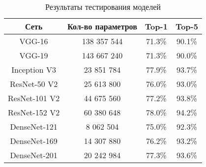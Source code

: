 \begin{table}[H]
    \centering
    \caption{Результаты тестирования моделей} \label{conv-test}
    \begin{tabular}{|c|c|c|c|}
      \hline    
      Сеть         & Кол-во параметров   & Top-1     & Top-5     \\
      \hline
      VGG-16       & 138 357 544         & 71.3\%	& 90.1\%    \\
      \hline
      VGG-19       & 143 667 240         & 71.3\%	& 90.0\%    \\
      \hline
      Inception V3 & 23 851 784          & 77.9\%	& 93.7\%    \\
      \hline
      ResNet-50 V2 & 25 613 800          & 76.0\%	& 93.0\%    \\
      \hline
      ResNet-101 V2 & 44 675 560	       & 77.2\%	& 93.8\%    \\
      \hline
      ResNet-152 V2 & 60 380 648	       & 78.0\%	& 94.2\%    \\
      \hline
      DenseNet-121 & 8 062 504           & 75.0\%	& 92.3\%    \\
      \hline
      DenseNet-169 & 14 307 880          & 76.2\%	& 93.2\%    \\
      \hline
      DenseNet-201 & 20 242 984          & 77.3\%	& 93.6\%    \\
      \hline
    \end{tabular}
  \end{table}